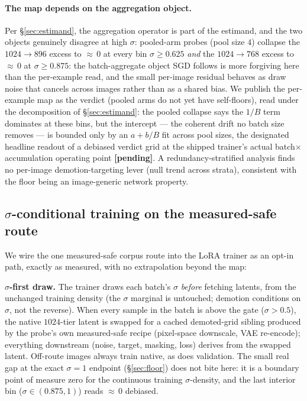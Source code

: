 \paragraph{The map depends on the aggregation object.}
Per \S\ref{sec:estimand}, the aggregation operator is part of the
estimand, and the two objects genuinely disagree at high $\sigma$:
pooled-arm probes (pool size $4$) collapse the $1024{\to}896$ excess to
${\approx}\,0$ at every bin $\sigma \ge 0.625$ \emph{and} the
$1024{\to}768$ excess to ${\approx}\,0$ at $\sigma \ge 0.875$: the
batch-aggregate object SGD follows is more forgiving here than the
per-example read, and the small per-image residual behaves as
draw noise that cancels across images rather than as a shared bias. We
publish the per-example map as the verdict (pooled arms do not yet
have self-floors), read under the decomposition of
\S\ref{sec:estimand}: the pooled collapse says the $1/B$ term
dominates at these bins, but the intercept --- the coherent drift no
batch size removes --- is bounded only by an $a + b/B$ fit across
pool sizes, the designated headline readout of a debiased verdict
grid at the shipped trainer's actual batch$\times$accumulation
operating point \textbf{[pending]}. A redundancy-stratified analysis finds no per-image
demotion-targeting lever (null trend across strata), consistent with
the floor being an image-generic network property.

\subsection{$\sigma$-conditional training on the measured-safe route}
\label{sec:trainer}

We wire the one measured-safe corpus route into the LoRA trainer as an
opt-in path, exactly as measured, with no extrapolation beyond the map:

\textbf{$\sigma$-first draw.} The trainer draws each batch's $\sigma$
\emph{before} fetching latents, from the unchanged training density (the
$\sigma$ marginal is untouched; demotion conditions on $\sigma$, not
the reverse). When every sample in the batch is above the gate
($\sigma > 0.5$), the native $1024$-tier latent is swapped for a cached
demoted-grid sibling produced by the probe's own measured-safe recipe
(pixel-space downscale, VAE re-encode); everything downstream (noise,
target, masking, loss) derives from the swapped latent. Off-route
images always train native, as does validation. The small real gap at
the exact $\sigma{=}1$ endpoint (\S\ref{sec:floor}) does not bite here:
it is a boundary point of measure zero for the continuous training
$\sigma$-density, and the last interior bin ($\sigma \in (0.875, 1)$)
reads ${\approx}\,0$ debiased.

